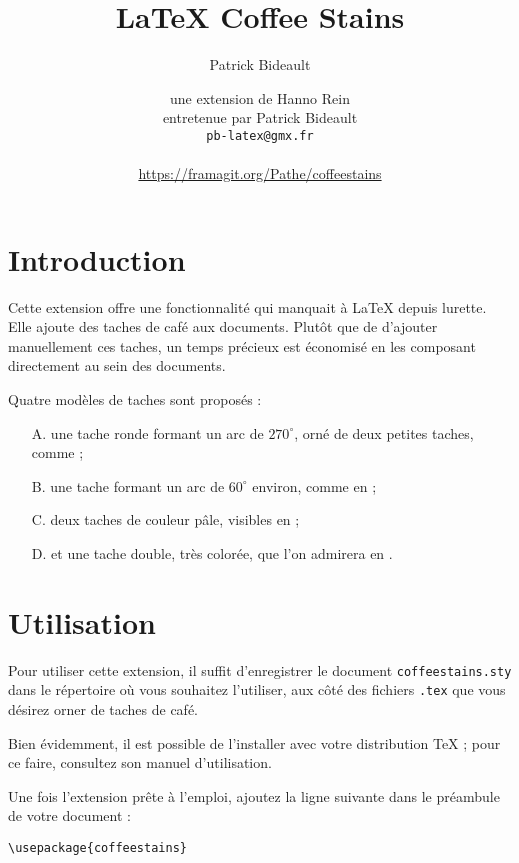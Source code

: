\documentclass[a4paper, 11pt, BCOR = 0 pt, DIV = 13, oneside, french]{scrartcl}
\author{Patrick Bideault}
\begin{document}
\title{LaTeX Coffee Stains}
\author{une extension de Hanno Rein\\
  entretenue par Patrick Bideault\\
  \texttt{pb-latex@gmx.fr}\\
  ~\\
  \url{https://framagit.org/Pathe/coffeestains}}
\renewcommand{\today}{version \gitRel{} -- \DTMtoday{}}
\maketitle

\label{stainA}
\section{Introduction}
Cette extension offre une fonctionnalité qui manquait à \LaTeX{} depuis
lurette. Elle ajoute des taches de café aux documents. Plutôt que de
d'ajouter manuellement ces taches, un temps précieux est
économisé en les composant directement au sein des documents.

Quatre modèles de taches sont proposés :

\begin{itemize}
\item[A.] une tache ronde formant un arc de $270^\circ$, orné de deux petites
  taches, comme  ;
  \item[B.] une tache formant un arc de $60^\circ$ environ, comme en
     ;
  \item[C.] deux taches de couleur pâle, visibles en  ;
  \item[D.] et une tache double, très colorée, que l'on admirera en .
\end{itemize}

\section{Utilisation}
Pour utiliser cette extension, il suffit d'enregistrer le document
\texttt{coffeestains.sty} dans le répertoire où vous souhaitez l'utiliser, aux
côté des fichiers \texttt{.tex} que vous désirez orner de taches de café.

Bien évidemment, il est possible de l'installer avec votre distribution \TeX{} ;
pour ce faire, consultez son manuel d'utilisation.

Une fois l'extension prête à l'emploi, ajoutez la ligne suivante dans le
préambule de votre document :
\begin{verbatim}
\usepackage{coffeestains}
\end{verbatim}
\vfill{}
\end{document}
